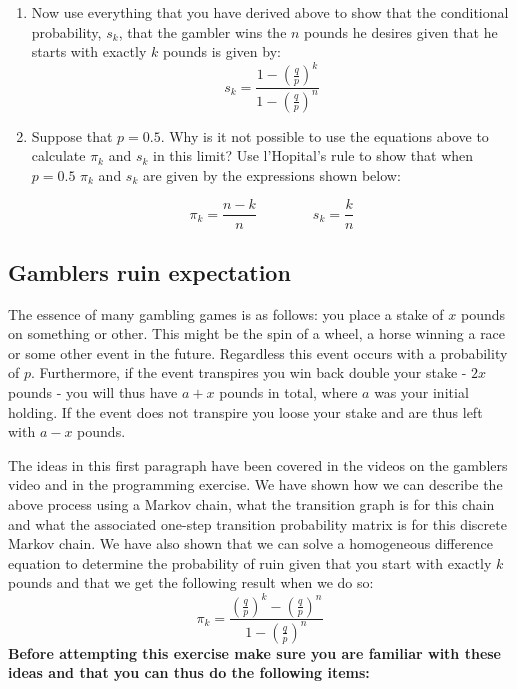 \documentclass[a4paper]{article}
\begin{document}
\begin{enumerate}
\item Now use everything that you have derived above to show that the conditional probability, $s_k$, that the gambler wins the $n$ pounds he desires given that he starts with exactly $k$ pounds is
given by:
$$
s_k = \frac{ 1 - \left( \frac{q}{p} \right)^k }{ 1 - \left( \frac{q}{p} \right)^n }
$$

\item Suppose that $p=0.5$.  Why is it not possible to use the equations above to calculate $\pi_k$ and $s_k$ in this limit?  Use l'Hopital's rule to show that when $p=0.5$ $\pi_k$ and
$s_k$ are given by the expressions shown below:

$$
\pi_k = \frac{ n-k }{n } \qquad \qquad s_k = \frac{ k}{n} 
$$

\end{enumerate}

\subsection{Gamblers ruin expectation}


The essence of many gambling games is as follows: you place a stake of $x$ pounds on something or other.  This might be the spin of a wheel, a horse winning a race or some other event in the future.
Regardless this event occurs with a probability of $p$.  Furthermore, if the event transpires you win back double your stake - $2x$ pounds - you will thus have $a + x$ pounds in total, where $a$ was
your initial holding.  If the event does not transpire you loose your stake and are thus left with $a - x$ pounds.

The ideas in this first paragraph have been covered in the videos on the gamblers video and in the programming exercise.  We have shown how we can describe the above process using a Markov chain,
what the transition graph is for this chain and what the associated one-step transition probability matrix is for this discrete Markov chain.  We have also shown that we can solve a homogeneous
difference equation to determine the probability of ruin given that you start with exactly $k$ pounds and that we get the following result when we do so:
$$
\pi_k = \frac{ \left( \frac{q}{p} \right)^k - \left( \frac{q}{p} \right)^n }{ 1 - \left( \frac{q}{p} \right)^n }
$$
{\bf Before attempting this exercise make sure you are familiar with these ideas and that you can thus do the following items:}
\end{document}
